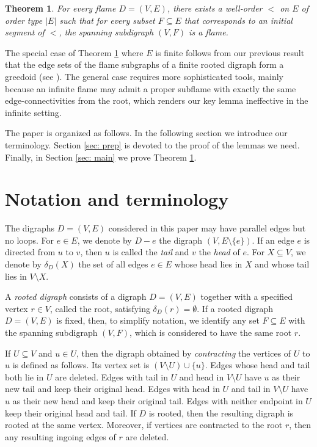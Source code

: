 \documentclass[12pt,a4paper]{amsart}
\theoremstyle{plain}
\newtheorem{theorem}{Theorem}[section]
\theoremstyle{definition}
\begin{document}
\begin{theorem}\label{thm: main}
For every flame $D=(V,E)$, there exists a well-order 
$<$ on $ E $ of order type $ 
\left|E\right| $ such that for every subset $F\subseteq E$ that corresponds to an initial segment of $<$, the spanning subdigraph $  (V,F)  $ is 
a flame.
\end{theorem}

 
The special case of Theorem \ref{thm: main} where $E$ is finite follows from our previous result that the edge sets of the 
flame subgraphs of a finite rooted digraph form a greedoid (see \cite[Theorem 1.2]{jooGreedoidFlame2021}). The general case requires more 
sophisticated tools, mainly because an infinite flame may admit a proper subflame with exactly the same edge-connectivities from the root, which 
renders our key lemma \cite[Lemma 3.1]{jooGreedoidFlame2021} ineffective in the infinite setting.

The paper is organized as follows. In the following section we introduce our terminology. Section \ref{sec: prep} is devoted to the proof of the 
lemmas 
 we need. Finally, in Section \ref{sec: main} we prove Theorem \ref{thm: main}.
\section{Notation and terminology}

The digraphs $D=(V,E)$ considered in this paper may have parallel edges but no loops.
For $e\in E$, we denote by $D-e$ the digraph $(V,E\setminus\{e\})$.
If an edge $e$ is directed from $u$ to $v$, then $u$ is called the \emph{tail} and $v$ the \emph{head} of $e$.
For $X\subseteq V$, we denote by $\delta_D(X)$ the set of all edges $e\in E$ whose head lies in $X$ and whose tail lies in $V\setminus X$.

A \emph{rooted digraph} consists of a digraph $D=(V,E)$ together with a specified vertex $r\in V$, called the root, satisfying 
$\delta_D(r)=\emptyset$.
If a rooted digraph $D=(V,E)$ is fixed, then, to simplify notation, we identify any set $F\subseteq E$ with the spanning subdigraph $(V,F)$, which 
is considered to have the same root $r$.

If $U\subseteq V$ and $u\in U$, then the digraph obtained by \emph{contracting} the vertices of $U$ to $u$ is defined as follows.
Its vertex set is $(V\setminus U)\cup\{u\}$.
Edges whose head and tail both lie in $U$ are deleted.
Edges with tail in $U$ and head in $V\setminus U$ have $u$ as their new tail and keep their original head.
Edges with head in $U$ and tail in $V\setminus U$ have $u$ as their new head and keep their original tail.
Edges with neither endpoint in $U$ keep their original head and tail.
If $D$ is rooted, then the resulting digraph is rooted at the same vertex.
Moreover, if vertices are contracted to the root $r$, then any resulting ingoing edges of $r$ are deleted.
\end{document}
